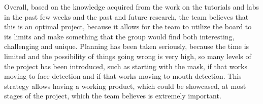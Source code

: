 Overall, based on the knowledge acquired from the work on the tutorials and labs in the past few weeks and the past and future research, the team believes that this is an optimal project, because it allows for the team to utilize the board to its limits and make something that the group would find both interesting, challenging and unique. Planning has been taken seriously, because the time is limited and the possibility of things going wrong is very high, so many levels of the project has been introduced, such as starting with the mask, if that works moving to face detection and if that works moving to mouth detection. This strategy allows having a working product, which could be showcased, at most stages of the project, which the team believes is extremely important.